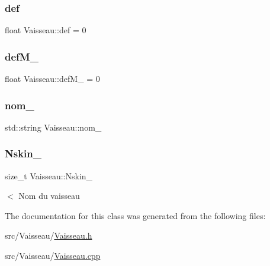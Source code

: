 \mbox{\label{class_vaisseau_a98239763c1a44cea172db2cdf5625afe}} 
\subsubsection{\texorpdfstring{def}{def}}
{\footnotesize\ttfamily float Vaisseau\+::def = 0\hspace{0.3cm}{\ttfamily [protected]}}

\mbox{\label{class_vaisseau_a286c951036adbdfe3deca442fc72160a}} 
\subsubsection{\texorpdfstring{def\+M\+\_\+}{defM\_}}
{\footnotesize\ttfamily float Vaisseau\+::def\+M\+\_\+ = 0\hspace{0.3cm}{\ttfamily [protected]}}

\mbox{\label{class_vaisseau_a2abb8ab70479bc486d19b563dddbe825}} 
\subsubsection{\texorpdfstring{nom\+\_\+}{nom\_}}
{\footnotesize\ttfamily std\+::string Vaisseau\+::nom\+\_\+\hspace{0.3cm}{\ttfamily [protected]}}

\mbox{\label{class_vaisseau_a45365e5a9abdc0a5ea990fa6c36f224b}} 
\subsubsection{\texorpdfstring{Nskin\+\_\+}{Nskin\_}}
{\footnotesize\ttfamily size\+\_\+t Vaisseau\+::\+Nskin\+\_\+\hspace{0.3cm}{\ttfamily [protected]}}



$<$ Nom du vaisseau 



The documentation for this class was generated from the following files\+:\begin{DoxyCompactItemize}
\item 
src/\+Vaisseau/\mbox{\hyperlink{_vaisseau_8h}{Vaisseau.\+h}}\item 
src/\+Vaisseau/\mbox{\hyperlink{_vaisseau_8cpp}{Vaisseau.\+cpp}}\end{DoxyCompactItemize}

